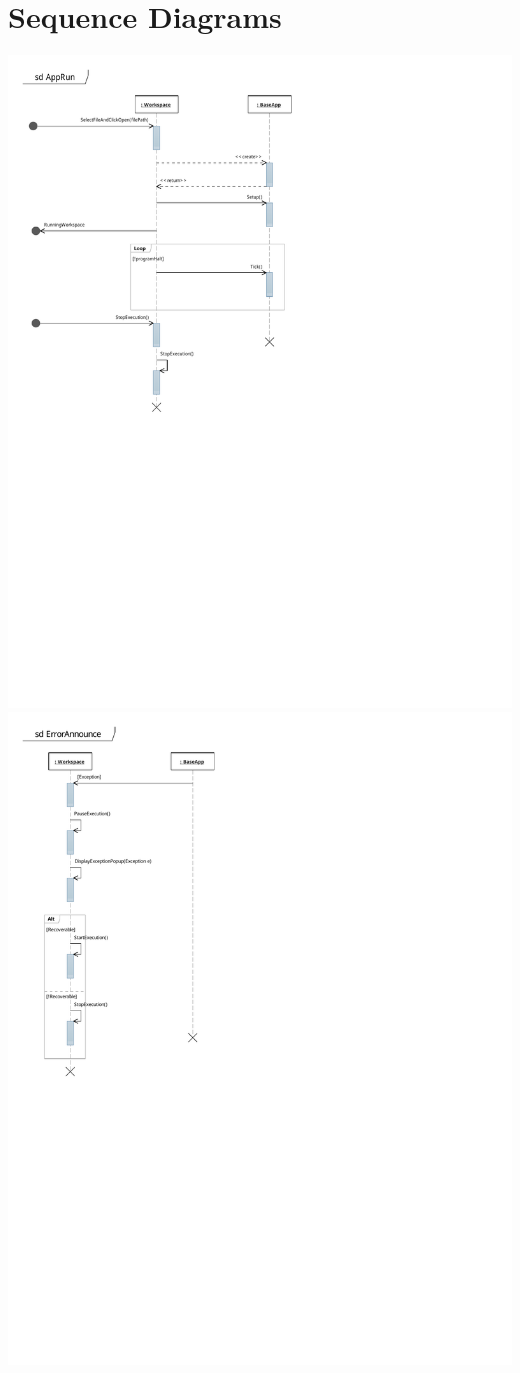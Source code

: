 \documentclass[12pt]{article}
\begin{document}
\section{Sequence Diagrams}
\begin{center}
        \includegraphics[scale=1]{./pdfs/Models/SD - AppRun.pdf}
        \includegraphics[scale=1]{./pdfs/Models/SD - ErrorAnnounce.pdf}
\end{center}
        
\end{document}
